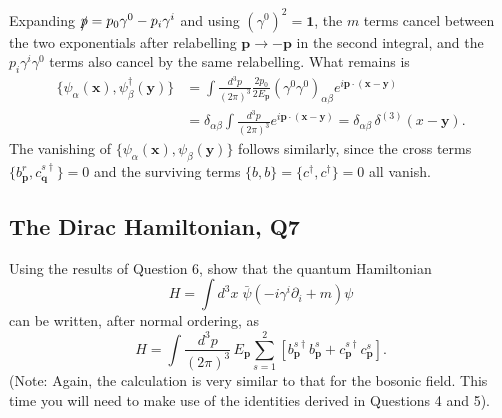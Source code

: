 \begin{solution}
\begin{equation}
    \end{equation}
    Expanding $\slashed{p} = p_0\gamma^0 - p_i\gamma^i$ and using $(\gamma^0)^2 = \mathbf{1}$, the $m$ terms cancel between the two exponentials after relabelling $\mathbf{p}\to-\mathbf{p}$ in the second integral, and the $p_i\gamma^i\gamma^0$ terms also cancel by the same relabelling. What remains is
    \begin{equation}
    \begin{aligned}
        \{\psi_\alpha(\mathbf{x}), \psi^\dagger_\beta(\mathbf{y})\} &= \int\frac{d^3p}{(2\pi)^3}\frac{2p_0}{2E_\mathbf{p}}(\gamma^0\gamma^0)_{\alpha\beta}e^{i\mathbf{p}\cdot(\mathbf{x}-\mathbf{y})}\\
        &= \delta_{\alpha\beta}\int\frac{d^3p}{(2\pi)^3}e^{i\mathbf{p}\cdot(\mathbf{x}-\mathbf{y})} = \delta_{\alpha\beta}\,\delta^{(3)}( {x}-\mathbf{y}).
    \end{aligned}
    \end{equation}
    The vanishing of $\{\psi_\alpha(\mathbf{x}),\psi_\beta(\mathbf{y})\}$ follows similarly, since the cross terms $\{b^r_\mathbf{p}, c^{s\dagger}_\mathbf{q}\} = 0$ and the surviving terms $\{b,b\} = \{c^\dagger, c^\dagger\} = 0$ all vanish.
\end{solution}

\subsection{The Dirac Hamiltonian, Q7}

Using the results of Question 6, show that the quantum Hamiltonian
\begin{equation}
    H = \int d^3x\; \bar\psi(-i\gamma^i\partial_i + m)\psi
\end{equation}
can be written, after normal ordering, as
\begin{equation}
    H = \int\frac{d^3p}{(2\pi)^3}\,E_{\mathbf{p}}\sum_{s=1}^{2}\left[b^{s\dagger}_{\mathbf{p}}b^s_{\mathbf{p}} + c^{s\dagger}_{\mathbf{p}}c^s_{\mathbf{p}}\right].
\end{equation}
(Note: Again, the calculation is very similar to that for the bosonic field. This time you will need to make use of the identities derived in Questions 4 and 5).

